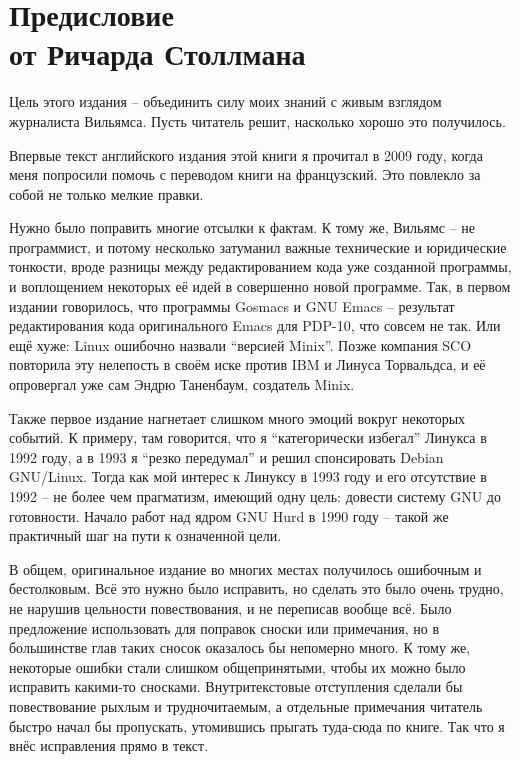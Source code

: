 
\chapter[Предисловие от Ричарда Столлмана]{Предисловие\\от Ричарда Столлмана}

Цель этого издания -- объединить силу моих знаний с живым взглядом журналиста Вильямса. Пусть читатель решит, насколько хорошо это получилось.

Впервые текст английского издания этой книги я прочитал в 2009 году, когда меня попросили помочь с переводом книги на французский. Это повлекло за собой не только мелкие правки.

Нужно было поправить многие отсылки к фактам. К тому же, Вильямс -- не программист, и потому несколько затуманил важные технические и юридические тонкости, вроде разницы между редактированием кода уже созданной программы, и воплощением некоторых её идей в совершенно новой программе. Так, в первом издании говорилось, что программы Gosmacs и GNU Emacs -- результат редактирования кода оригинального Emacs для PDP-10, что совсем не так. Или ещё хуже: Linux ошибочно назвали \enquote{версией Minix}. Позже компания SCO повторила эту нелепость в своём иске против IBM и Линуса Торвальдса, и её опровергал уже сам Эндрю Таненбаум, создатель Minix.

Также первое издание нагнетает слишком много эмоций вокруг некоторых событий. К примеру, там говорится, что я \enquote{категорически избегал} Линукса в 1992 году, а в 1993 я \enquote{резко передумал} и решил спонсировать Debian GNU/Linux. Тогда как мой интерес к Линуксу в 1993 году и его отсутствие в 1992 -- не более чем прагматизм, имеющий одну цель: довести систему GNU до готовности. Начало работ над ядром GNU Hurd в 1990 году -- такой же практичный шаг на пути к означенной цели.

В общем, оригинальное издание во многих местах получилось ошибочным и бестолковым. Всё это нужно было исправить, но сделать это было очень трудно, не нарушив цельности повествования, и не переписав вообще всё. Было предложение использовать для поправок сноски или примечания, но в большинстве глав таких сносок оказалось бы непомерно много. К тому же, некоторые ошибки стали слишком общепринятыми, чтобы их можно было исправить какими-то сносками. Внутритекстовые отступления сделали бы повествование рыхлым и трудночитаемым, а отдельные примечания читатель быстро начал бы пропускать, утомившись прыгать туда-сюда по книге. Так что я внёс исправления прямо в текст.

